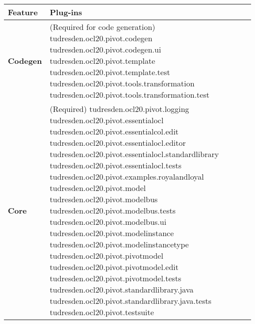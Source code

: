 \begin{table}[p]
\begin{tabular}{|p{4cm}|p{10cm}|}
    \hline
    \textbf{Feature} & \textbf{Plug-ins} \\
    \hline

    \textbf{Codegen} &
    (Required for code generation)\newline
    tudresden.ocl20.pivot.codegen\newline
    tudresden.ocl20.pivot.codegen.ui\newline
    tudresden.ocl20.pivot.template\newline
    tudresden.ocl20.pivot.template.test\newline
    tudresden.ocl20.pivot.tools.transformation\newline
    tudresden.ocl20.pivot.tools.transformation.test\\
    \hline

    \textbf{Core} & 
    (Required)\newline
    tudresden.ocl20.pivot.logging\newline
    tudresden.ocl20.pivot.essentialocl\newline
    tudresden.ocl20.pivot.essentialcol.edit\newline
    tudresden.ocl20.pivot.essentialocl.editor\newline
    tudresden.ocl20.pivot.essentialocl.standardlibrary\newline
    tudresden.ocl20.pivot.essentialocl.tests\newline
    tudresden.ocl20.pivot.examples.royalandloyal\newline
    tudresden.ocl20.pivot.model\newline
    tudresden.ocl20.pivot.modelbus\newline
    tudresden.ocl20.pivot.modelbus.tests\newline
    tudresden.ocl20.pivot.modelbus.ui\newline
    tudresden.ocl20.pivot.modelinstance\newline
    tudresden.ocl20.pivot.modelinstancetype\newline
    tudresden.ocl20.pivot.pivotmodel\newline
    tudresden.ocl20.pivot.pivotmodel.edit\newline
    tudresden.ocl20.pivot.pivotmodel.tests\newline
    tudresden.ocl20.pivot.standardlibrary.java\newline
    tudresden.ocl20.pivot.standardlibrary.java.tests\newline
    tudresden.ocl20.pivot.testsuite\\
    \hline


\end{tabular}
\end{table}
